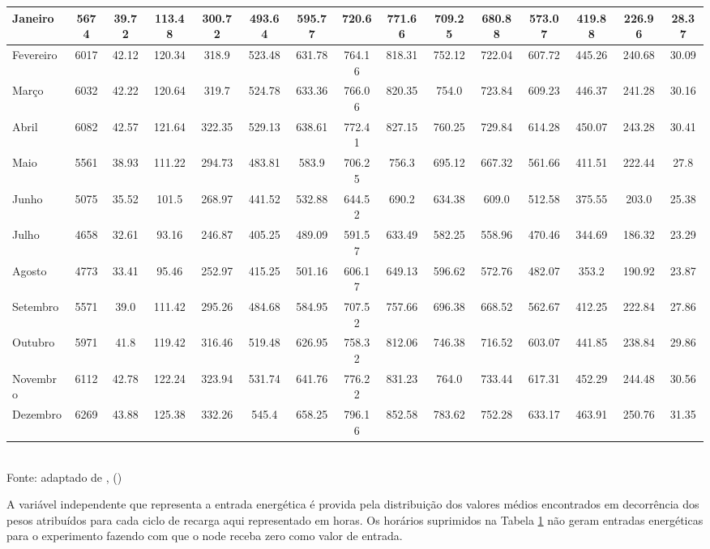 \begin{table}[h]
\begin{tabular}{l c | *{13}{c} }
	\hline
	Janeiro & 5674 & 39.72 & 113.48 & 300.72 & 493.64 & 595.77 & 720.6 & 771.66 & 709.25 & 680.88 & 573.07 & 419.88 & 226.96 & 28.37 \\
	\hline
	Fevereiro & 6017 & 42.12 & 120.34 & 318.9 & 523.48 & 631.78 & 764.16 & 818.31 & 752.12 & 722.04 & 607.72 & 445.26 & 240.68 & 30.09\\
	\hline
	Março & 6032 &  42.22 & 120.64 & 319.7 & 524.78 & 633.36 & 766.06 & 820.35 & 754.0 & 723.84 & 609.23 & 446.37 & 241.28 & 30.16\\
	\hline
	Abril & 6082 & 42.57 & 121.64 & 322.35 & 529.13 & 638.61 & 772.41 & 827.15 & 760.25 & 729.84 & 614.28 & 450.07 & 243.28 & 30.41 \\
	\hline
	Maio & 5561 & 38.93 & 111.22 & 294.73 & 483.81 & 583.9 & 706.25 & 756.3 & 695.12 & 667.32 & 561.66 & 411.51 & 222.44 & 27.8 \\
	\hline
	Junho & 5075 & 35.52 & 101.5 & 268.97 & 441.52 & 532.88 & 644.52 & 690.2 & 634.38 & 609.0 & 512.58 & 375.55 & 203.0 & 25.38 \\
	\hline
	Julho & 4658 & 32.61 & 93.16 & 246.87 & 405.25 & 489.09 & 591.57 & 633.49 & 582.25 & 558.96 & 470.46 & 344.69 & 186.32 & 23.29 \\
	\hline
	Agosto & 4773 & 33.41 & 95.46 & 252.97 & 415.25 & 501.16 & 606.17 & 649.13 & 596.62 & 572.76 & 482.07 & 353.2 & 190.92 & 23.87 \\
	\hline
	Setembro & 5571 & 39.0 & 111.42 & 295.26 & 484.68 & 584.95 & 707.52 & 757.66 & 696.38 & 668.52 & 562.67 & 412.25 & 222.84 & 27.86 \\
	\hline
	Outubro & 5971 & 41.8 & 119.42 & 316.46 & 519.48 & 626.95 & 758.32 & 812.06 & 746.38 & 716.52 & 603.07 & 441.85 & 238.84 & 29.86 \\
	\hline
	Novembro & 6112 & 42.78 & 122.24 & 323.94 & 531.74 & 641.76 & 776.22 & 831.23 & 764.0 & 733.44 & 617.31 & 452.29 & 244.48 & 30.56 \\
	\hline
	Dezembro & 6269 & 43.88 & 125.38 & 332.26 & 545.4 & 658.25 & 796.16 & 852.58 & 783.62 & 752.28 & 633.17 & 463.91 & 250.76 & 31.35 \\
\bottomrule
\end{tabular}
\label{table:cap6distribuicaonatal}
\\
\footnotesize Fonte: adaptado de \citeauthor{martins2017atlas}, (\citeyear{martins2017atlas})

\end{table}
\endgroup

A variável independente que representa a entrada energética é provida pela distribuição dos valores médios encontrados em decorrência dos pesos atribuídos para cada ciclo de recarga aqui representado em horas. Os horários suprimidos na Tabela \ref{table:cap6distribuicaonatal} não geram entradas energéticas para o experimento fazendo com que o node receba zero como valor de entrada.

